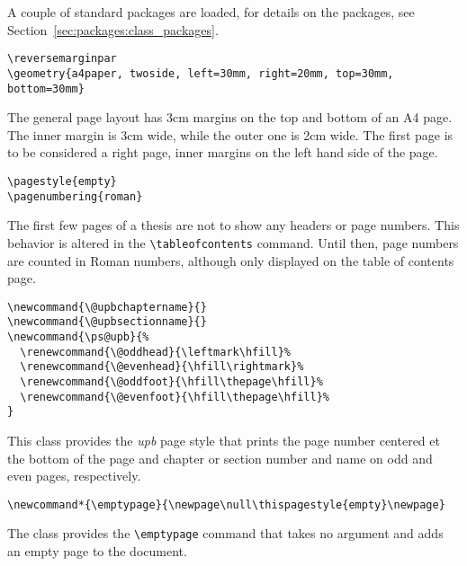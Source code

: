 \vspace*{-6pt} \noindent
A couple of standard packages are loaded, for details on the packages, see
Section~\ref{sec:packages:class_packages}.



\begin{verbatim}
\reversemarginpar
\geometry{a4paper, twoside, left=30mm, right=20mm, top=30mm, bottom=30mm}
\end{verbatim}

\vspace*{-6pt} \noindent
The general page layout has 3cm margins on the top and bottom of an A4 page.
The inner margin is 3cm wide, while the outer one is 2cm wide.
The first page is to be considered a right page, \ie{} inner margins on the
left hand side of the page.



\begin{verbatim}
\pagestyle{empty}
\pagenumbering{roman}
\end{verbatim}

\vspace*{-6pt} \noindent
The first few pages of a thesis are not to show any headers or page numbers.
This behavior is altered in the \verb+\tableofcontents+ command.
Until then, page numbers are counted in Roman numbers, although only displayed
on the table of contents page.



\begin{verbatim}
\newcommand{\@upbchaptername}{}
\newcommand{\@upbsectionname}{}
\newcommand{\ps@upb}{%
  \renewcommand{\@oddhead}{\leftmark\hfill}%
  \renewcommand{\@evenhead}{\hfill\rightmark}%
  \renewcommand{\@oddfoot}{\hfill\thepage\hfill}%
  \renewcommand{\@evenfoot}{\hfill\thepage\hfill}%
}
\end{verbatim}

\vspace*{-6pt} \noindent
This class provides the \emph{upb} page style that prints the page number
centered et the bottom of the page and chapter or section number and name on
odd and even pages, respectively.


\begin{verbatim}
\newcommand*{\emptypage}{\newpage\null\thispagestyle{empty}\newpage}
\end{verbatim}

\vspace*{-6pt} \noindent
The class provides the \verb+\emptypage+ command that takes no argument and
adds an empty page to the document.



